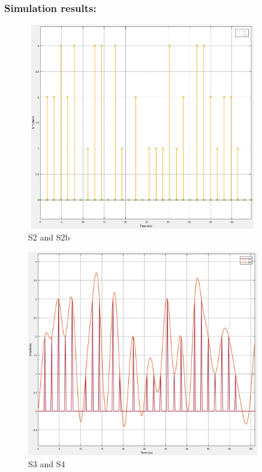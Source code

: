 \subsubsection{Simulation results:}

\begin{figure}[h]
	\centering
	\includegraphics[width=0.9\textwidth, height=9cm]{./sdf/simplified_coherent_receiver/figures/S2S2b.png}
	\caption{S2 and S2b}\label{}
\end{figure}

\begin{figure}[h]
	\centering
	\includegraphics[width=0.9\textwidth, height=9cm]{./sdf/simplified_coherent_receiver/figures/S3S4.png}
	\caption{S3 and S4}\label{}
\end{figure}

